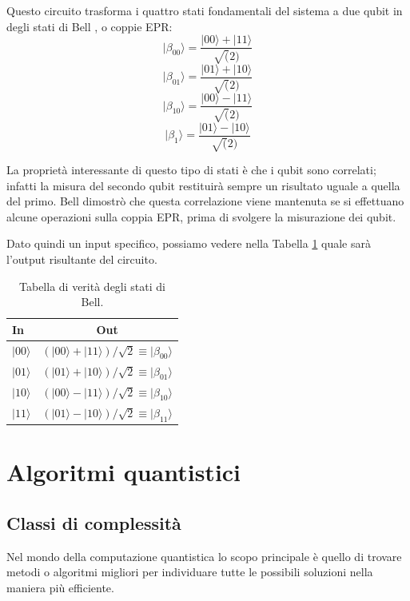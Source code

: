 Questo circuito trasforma i quattro stati fondamentali del sistema a due qubit in degli stati di Bell \cite{cambridge2010book}, o coppie EPR:
\begin{equation}
    |\beta_{00}\rangle =\dfrac{|00\rangle + |11\rangle}{\sqrt(2)}
\end{equation}
\begin{equation}
    |\beta_{01}\rangle =\dfrac{|01\rangle + |10\rangle}{\sqrt(2)}
\end{equation}
\begin{equation}
    |\beta_{10}\rangle =\dfrac{|00\rangle - |11\rangle}{\sqrt(2)}
\end{equation}\begin{equation}
    |\beta_{1}\rangle =\dfrac{|01\rangle - |10\rangle}{\sqrt(2)}
\end{equation}

La proprietà interessante di questo tipo di stati è che i qubit sono correlati; infatti la misura del secondo qubit restituirà sempre un risultato uguale a quella del primo. Bell dimostrò che questa correlazione viene mantenuta se si effettuano alcune operazioni sulla coppia EPR, prima di svolgere la misurazione dei qubit.

Dato quindi un input specifico, possiamo vedere nella Tabella \ref{table:verita_bell} quale sarà l'output risultante del circuito.
\begin{table}[ht]
\centering
\begin{tabular}{l|c}
    \hline\hline
    \textbf{In} &  \textbf{Out}\\
    \hline
    $|00\rangle$ & {$(|00\rangle + |11\rangle)/\sqrt{2}\equiv |\beta_{00}\rangle$}\\
    $|01\rangle$ & {$(|01\rangle + |10\rangle)/\sqrt{2}\equiv |\beta_{01}\rangle$}\\
    $|10\rangle$ & {$(|00\rangle - |11\rangle)/\sqrt{2}\equiv |\beta_{10}\rangle$}\\
    $|11\rangle$ & {$(|01\rangle - |10\rangle)/\sqrt{2}\equiv |\beta_{11}\rangle$}\\
    \hline\hline
\end{tabular}
\caption{Tabella di verità degli stati di Bell.}
\label{table:verita_bell}
\end{table}

\section{Algoritmi quantistici}
\subsection{Classi di complessità}
Nel mondo della computazione quantistica lo scopo principale è quello di trovare metodi o algoritmi migliori per individuare tutte le possibili soluzioni nella maniera più efficiente.

